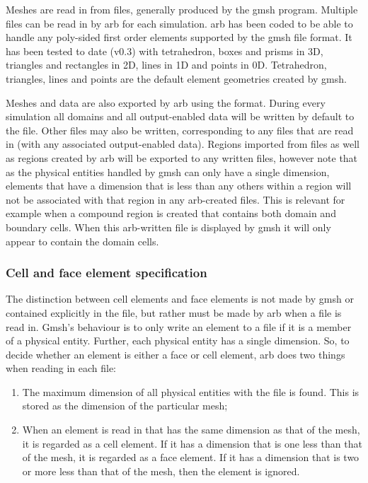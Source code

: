 Meshes are read in from  files, generally produced by the gmsh program.  Multiple  files can be read in by arb for each simulation.  arb has been coded to be able to handle any poly-sided first order elements supported by the gmsh file format.   It has been tested to date (v0.3) with tetrahedron, boxes and prisms in 3D, triangles and rectangles in 2D, lines in 1D and points in 0D.  Tetrahedron, triangles, lines and points are the default element geometries created by gmsh.

Meshes and data are also exported by arb using the  format.  During every simulation all domains and all output-enabled data will be written by default to the  file.  Other files may also be written, corresponding to any  files that are read in (with any associated output-enabled data).  Regions imported from  files as well as regions created by arb will be exported to any written  files, however note that as the physical entities handled by gmsh can only have a single dimension, elements that have a dimension that is less than any others within a region will not be associated with that region in any arb-created  files.  This is relevant for example when a compound region is created that contains both domain and boundary cells.  When this arb-written  file is displayed by gmsh it will only appear to contain the domain cells.

\subsubsection{Cell and face element specification}

The distinction between cell elements and face elements is not made by gmsh or contained explicitly in the  file, but rather must be made by arb when a  file is read in.  Gmsh's behaviour is to only write an element to a  file if it is a member of a physical entity.  Further, each physical entity has a single dimension.  So, to decide whether an element is either a face or cell element, arb does two things when reading in each  file:
%
\begin{enumerate}
\item The maximum dimension of all physical entities with the  file is found.  This is stored as the dimension of the particular mesh;
\item When an element is read in that has the same dimension as that of the mesh, it is regarded as a cell element.  If it has a dimension that is one less than that of the mesh, it is regarded as a face element.  If it has a dimension that is two or more less than that of the mesh, then the element is ignored.
\end{enumerate}
 
